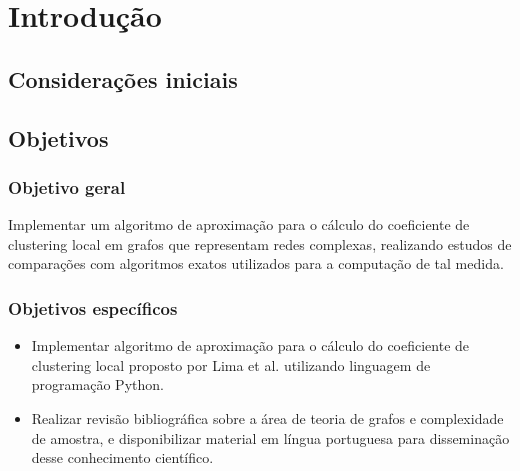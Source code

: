 
\chapter{Introdução}\label{cap:introducao}


\section{Considerações iniciais}\label{sec:consideracoesIniciais}


\section{Objetivos}\label{sec:objetivos}


\subsection{Objetivo geral}\label{subsec:objetivoGeral}

Implementar um algoritmo de aproximação para o cálculo do coeficiente de clustering local em grafos que representam redes complexas, realizando estudos de comparações com algoritmos exatos utilizados para a computação de tal medida.

\subsection{Objetivos específicos}\label{subsec:objetivosEspecificos}

\begin{itemize}
\item Implementar algoritmo de aproximação para o cálculo do coeficiente de clustering local proposto por Lima et al. \cite{Lima2022} utilizando linguagem de programação Python.

\item Realizar revisão bibliográfica sobre a área de teoria de grafos e complexidade de amostra, e disponibilizar material em língua portuguesa para disseminação desse conhecimento científico.
\end{itemize}

